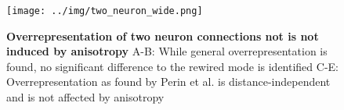 
\begin{figure}[h]
\texttt{[image: ../img/two\_neuron\_wide.png]} %
\caption{{\bf Overrepresentation of two neuron connections not is not
    induced by anisotropy}
A-B: While general overrepresentation is found, no significant
difference to the rewired mode is identified C-E: Overrepresentation
as found by Perin et al. is distance-independent and is not affected
by anisotropy}
\label{fig_two_neuron}%
\end{figure}

